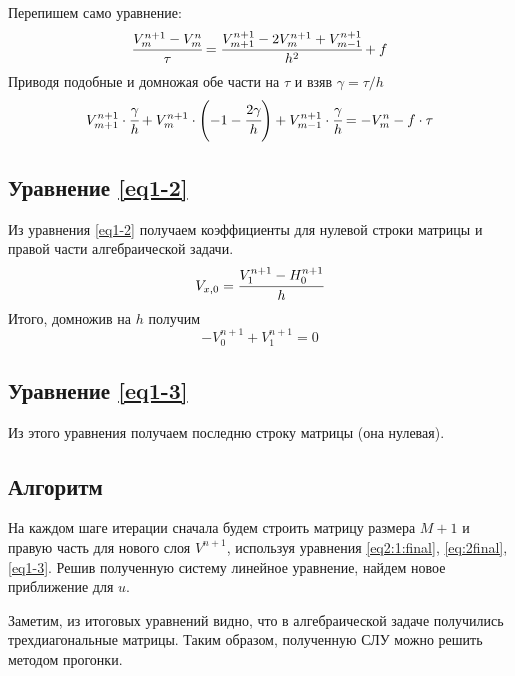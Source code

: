 \documentclass[12pt]{extarticle}
\numberwithin{equation}{section}
\begin{document}
Перепишем само уравнение:
$$\cfrac{V_m^{n+1} - V_m^n}{\tau} = \cfrac{V_{m+1}^{n+1} - 2V_m^{n+1} + V_{m-1}^{n+1}}{h^2} + f
$$
Приводя подобные и домножая обе части на $\tau$ и взяв $\gamma = \tau/h$
\begin{equation}
 V_{m+1}^{n+1} \cdot \cfrac{\gamma}{h} + V_m^{n+1} \cdot \left( -1 - \cfrac{2\gamma}{h}\right) + V_{m-1}^{n+1} \cdot \cfrac{\gamma}{h} = -V_m^n - f \cdot \tau
 \label{eq2:1:final}
\end{equation}

\subsection{Уравнение \ref{eq1-2}}
Из уравнения \ref{eq1-2} получаем коэффициенты для нулевой строки матрицы и правой части алгебраической задачи.
\begin{align*}
&V_{x, 0} = \cfrac{V_1^{n+1} - H_0^{n+1}}{h}\\
\end{align*}
Итого, домножив на $h$ получим
\begin{equation}
-V_0^{n+1} + V_{1}^{n+1} = 0 \label{eq:2final}
\end{equation}

\subsection{Уравнение \ref{eq1-3}}
Из этого уравнения получаем последню строку матрицы (она нулевая).

\subsection{Алгоритм}
На каждом шаге итерации сначала будем строить матрицу размера $M+1$ и правую часть для нового слоя $V^{n+1}$, используя уравнения \ref{eq2:1:final}, \ref{eq:2final}, \ref{eq1-3}.
Решив полученную систему линейное уравнение, найдем новое приближение для $u$.

Заметим, из итоговых уравнений видно, что в алгебраической задаче получились трехдиагональные матрицы.
Таким образом, полученную СЛУ можно решить методом прогонки.

\newpage
\appendix \label{grap1}
\end{document}

